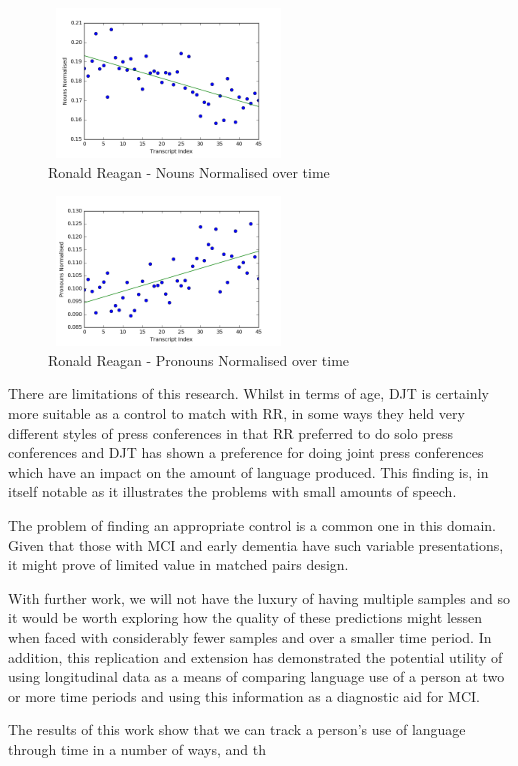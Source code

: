\documentclass[10pt, letterpaper, twoside, openany]{book}
\begin{document}
\begin{figure}[H]
	\centering
	\includegraphics[width=240px, height=150px]{images/RRNounsNormalised.png}
	\caption{Ronald Reagan - Nouns Normalised over time}
\end{figure}

\begin{figure}[H]
	\centering
	\includegraphics[width=240px, height=150px]{images/RRPronouns.png}
	\caption{Ronald Reagan - Pronouns Normalised over time}
\end{figure}
 
There are limitations of this research. Whilst in terms of age, DJT is certainly more suitable as a control to match with RR, in some ways they held very different styles of press conferences in that RR preferred to do solo press conferences and DJT has shown a preference for doing joint press conferences which have an impact on the amount of language produced. This finding is, in itself notable as it illustrates the problems with small amounts of speech. 
\par
The problem of finding an appropriate control is a common one in this domain. Given that those with MCI and early dementia have such variable presentations, it might prove of limited value in matched pairs design. 
\par 
With further work, we will not have the luxury of having multiple samples and so it would be worth exploring how the quality of these predictions might lessen when faced with considerably fewer samples and over a smaller time period. In addition, this replication and extension has demonstrated the potential utility of using longitudinal data as a means of comparing language use of a person at two or more time periods and using this information as a diagnostic aid for MCI. 
\par 
The results of this work show that we can track a person's use of language through time in a number of ways, and th
\end{document}
